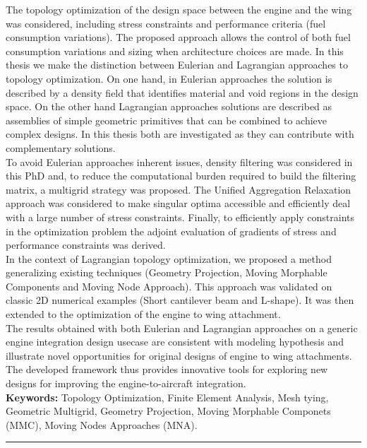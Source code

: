 The topology optimization of the design space between the engine and the wing was considered, including stress constraints and performance criteria (fuel consumption variations). The proposed approach allows the control of both fuel consumption variations and sizing when architecture choices are made. In this thesis we make the distinction between Eulerian and Lagrangian approaches to topology optimization. On one hand, in Eulerian approaches the solution is described by a density field that identifies material and void regions in the design space. On the other hand Lagrangian approaches solutions are described as assemblies of simple geometric primitives that can be combined to achieve complex designs. In this thesis both are investigated as they can contribute with complementary solutions.\\
To avoid Eulerian approaches inherent issues, density filtering was considered in this PhD and, to reduce the computational burden required to build the filtering matrix, a multigrid strategy was proposed. The Unified Aggregation Relaxation approach was considered to make singular optima accessible and efficiently deal with a large number of stress constraints. Finally, to efficiently apply constraints in the optimization problem the adjoint evaluation of gradients of stress and performance constraints was derived.
\\
In the context of Lagrangian topology optimization, we proposed a method generalizing existing techniques (Geometry Projection, Moving Morphable Components and Moving Node Approach). This approach was validated on classic 2D numerical examples (Short cantilever beam and L-shape). It was then extended to the optimization of the engine to wing attachment.\\
The results obtained with both Eulerian and Lagrangian approaches on a generic engine integration design usecase are consistent with modeling hypothesis and illustrate novel opportunities for original designs of engine to wing attachments. The developed framework thus provides innovative tools for exploring new designs for improving the engine-to-aircraft integration.\\

{\large\textbf{Keywords:}}
    Topology Optimization, Finite Element Analysis, Mesh tying, Geometric Multigrid, Geometry Projection, Moving Morphable Componets (MMC), Moving Nodes Approaches (MNA).
\\
\noindent\rule[2pt]{\textwidth}{0.5pt}

\pagebreak

